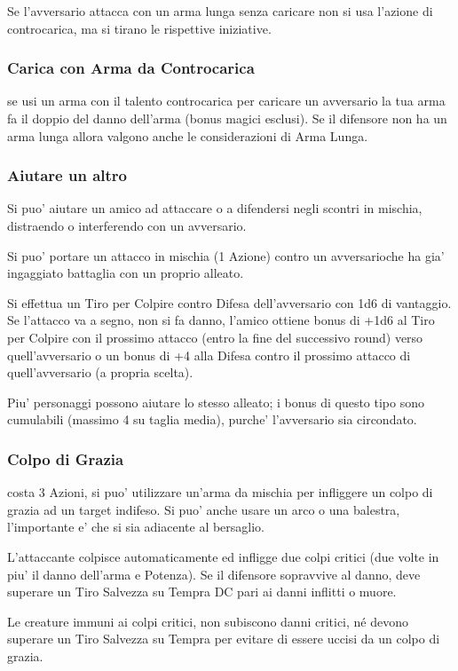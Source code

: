 \documentclass[a4paper,11pt,twoside,openany]{dndbook}
\begin{document}
Se l'avversario attacca con un arma lunga senza caricare non si usa
l'azione di controcarica, ma si tirano le rispettive iniziative.

\subsubsection{Carica con Arma da Controcarica} se usi un arma con il talento controcarica per caricare un avversario la tua arma fa il doppio del danno dell'arma (bonus magici esclusi). Se il difensore non ha un arma lunga allora valgono anche le considerazioni di Arma Lunga.

\subsubsection{Aiutare un altro} Si puo' aiutare un amico ad attaccare o a difendersi negli scontri in mischia, distraendo o interferendo con un avversario.

Si puo' portare un attacco in mischia (1 Azione) contro un avversarioche ha gia' ingaggiato battaglia con un proprio alleato.

Si effettua un Tiro per Colpire contro Difesa dell'avversario con 1d6 di vantaggio. Se l'attacco va a segno, non si fa danno, l'amico ottiene bonus di +1d6 al Tiro per Colpire con il prossimo attacco (entro la fine del successivo round) verso quell'avversario o un bonus di +4 alla Difesa contro il prossimo attacco di quell'avversario (a propria scelta). 

Piu' personaggi possono aiutare lo stesso alleato; i bonus di questo tipo sono cumulabili (massimo 4 su taglia media), purche' l'avversario sia circondato.

\subsubsection{Colpo di Grazia} costa 3 Azioni, si puo' utilizzare un'arma da mischia per infliggere un colpo di grazia ad un target indifeso. Si puo' anche usare un arco o una balestra, l'importante e' che si sia adiacente al bersaglio.

L'attaccante colpisce automaticamente ed infligge due colpi critici (due volte in piu' il danno dell'arma e Potenza). Se il difensore sopravvive al danno, deve superare un Tiro Salvezza su Tempra DC pari ai danni inflitti o muore.

Le creature immuni ai colpi critici, non subiscono danni critici, né devono superare un Tiro Salvezza su Tempra per evitare di essere uccisi da un colpo di grazia.
\end{document}
